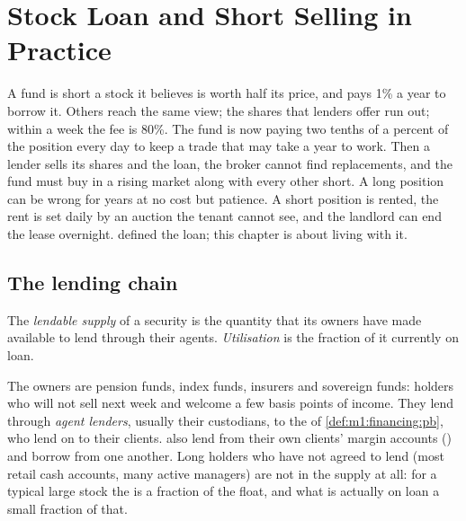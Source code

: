 \chapter{Stock Loan and Short Selling in Practice}\label{ch:m1:stock-loan-and-short-selling}

A fund is short a stock it believes is worth half its price, and pays 1\% a
year to borrow it. Others reach the same view; the shares that lenders offer
run out; within a week the fee is 80\%. The fund is now paying two tenths of
a percent of the position every day to keep a trade that may take a year to
work. Then a lender sells its shares and  the loan, the broker cannot
find replacements, and the fund must buy in a rising market along with every
other short. A long position can be wrong for years at no cost but patience.
A short position is rented, the rent is set daily by an auction the tenant
cannot see, and the landlord can end the lease overnight. 
defined the loan; this chapter is about living with it.

\section{The lending chain}

\begin{definition}\label{def:m1:stock-loan-and-short-selling:utilisation}
The \emph{lendable supply} of a security is the
quantity that its owners have made available to lend through their agents.
\emph{Utilisation} is the fraction of it currently on
loan.
\end{definition}

The owners are pension funds, index funds, insurers and sovereign funds:
holders who will not sell next week and welcome a few basis points of
income. They lend through \emph{agent lenders}, usually their custodians, to
the  of \cref{def:m1:financing:pb}, who lend on to their
clients.  also lend from their own clients' margin accounts
() and borrow from one another. Long holders who have not
agreed to lend (most retail cash accounts, many active managers) are not in
the supply at all: for a typical large stock the  is a
fraction of the float, and what is actually on loan a small fraction of
that.

